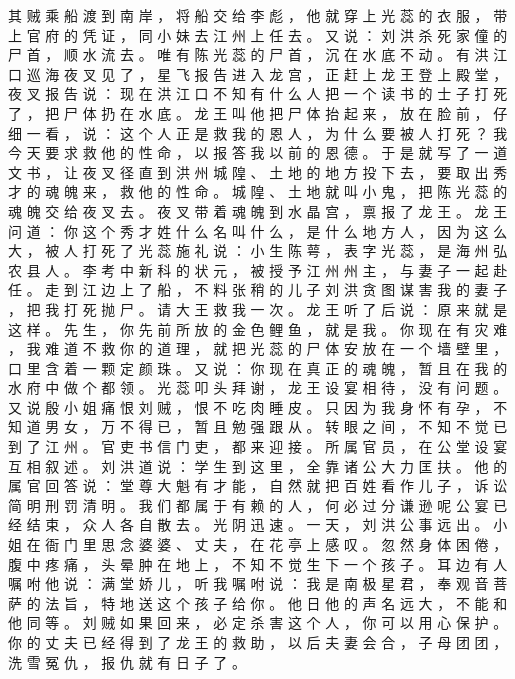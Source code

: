 {其 贼 乘 船 渡 到 南 岸 ， 将 船 交 给 李 彪 ， 他 就 穿 上 光 蕊 的 衣 服 ， 带 上 官 府 的 凭 证 ， 同 小 妹 去 江 州 上 任 去 。
又 说 ： 刘 洪 杀 死 家 僮 的 尸 首 ， 顺 水 流 去 。
唯 有 陈 光 蕊 的 尸 首 ， 沉 在 水 底 不 动 。
有 洪 江 口 巡 海 夜 叉 见 了 ， 星 飞 报 告 进 入 龙 宫 ， 正 赶 上 龙 王 登 上 殿 堂 ， 夜 叉 报 告 说 ： 现 在 洪 江 口 不 知 有 什 么 人 把 一 个 读 书 的 士 子 打 死 了 ， 把 尸 体 扔 在 水 底 。
龙 王 叫 他 把 尸 体 抬 起 来 ， 放 在 脸 前 ， 仔 细 一 看 ， 说 ： 这 个 人 正 是 救 我 的 恩 人 ， 为 什 么 要 被 人 打 死 ？
我 今 天 要 求 救 他 的 性 命 ， 以 报 答 我 以 前 的 恩 德 。
于 是 就 写 了 一 道 文 书 ， 让 夜 叉 径 直 到 洪 州 城 隍 、 土 地 的 地 方 投 下 去 ， 要 取 出 秀 才 的 魂 魄 来 ， 救 他 的 性 命 。
城 隍 、 土 地 就 叫 小 鬼 ， 把 陈 光 蕊 的 魂 魄 交 给 夜 叉 去 。
夜 叉 带 着 魂 魄 到 水 晶 宫 ， 禀 报 了 龙 王 。
龙 王 问 道 ： 你 这 个 秀 才 姓 什 么 名 叫 什 么 ， 是 什 么 地 方 人 ， 因 为 这 么 大 ， 被 人 打 死 了 光 蕊 施 礼 说 ： 小 生 陈 萼 ， 表 字 光 蕊 ， 是 海 州 弘 农 县 人 。
李 考 中 新 科 的 状 元 ， 被 授 予 江 州 州 主 ， 与 妻 子 一 起 赴 任 。
走 到 江 边 上 了 船 ， 不 料 张 稍 的 儿 子 刘 洪 贪 图 谋 害 我 的 妻 子 ， 把 我 打 死 抛 尸 。
请 大 王 救 我 一 次 。
龙 王 听 了 后 说 ： 原 来 就 是 这 样 。
先 生 ， 你 先 前 所 放 的 金 色 鲤 鱼 ， 就 是 我 。
你 现 在 有 灾 难 ， 我 难 道 不 救 你 的 道 理 ， 就 把 光 蕊 的 尸 体 安 放 在 一 个 墙 壁 里 ， 口 里 含 着 一 颗 定 颜 珠 。
又 说 ： 你 现 在 真 正 的 魂 魄 ， 暂 且 在 我 的 水 府 中 做 个 都 领 。
光 蕊 叩 头 拜 谢 ， 龙 王 设 宴 相 待 ， 没 有 问 题 。
又 说 殷 小 姐 痛 恨 刘 贼 ， 恨 不 吃 肉 睡 皮 。
只 因 为 我 身 怀 有 孕 ， 不 知 道 男 女 ， 万 不 得 已 ， 暂 且 勉 强 跟 从 。
转 眼 之 间 ， 不 知 不 觉 已 到 了 江 州 。
官 吏 书 信 门 吏 ， 都 来 迎 接 。
所 属 官 员 ， 在 公 堂 设 宴 互 相 叙 述 。
刘 洪 道 说 ： 学 生 到 这 里 ， 全 靠 诸 公 大 力 匡 扶 。
他 的 属 官 回 答 说 ： 堂 尊 大 魁 有 才 能 ， 自 然 就 把 百 姓 看 作 儿 子 ， 诉 讼 简 明 刑 罚 清 明 。
我 们 都 属 于 有 赖 的 人 ， 何 必 过 分 谦 逊 呢 公 宴 已 经 结 束 ， 众 人 各 自 散 去 。
光 阴 迅 速 。
一 天 ， 刘 洪 公 事 远 出 。
小 姐 在 衙 门 里 思 念 婆 婆 、 丈 夫 ， 在 花 亭 上 感 叹 。
忽 然 身 体 困 倦 ， 腹 中 疼 痛 ， 头 晕 肿 在 地 上 ， 不 知 不 觉 生 下 一 个 孩 子 。
耳 边 有 人 嘱 咐 他 说 ： 满 堂 娇 儿 ， 听 我 嘱 咐 说 ： 我 是 南 极 星 君 ， 奉 观 音 菩 萨 的 法 旨 ， 特 地 送 这 个 孩 子 给 你 。
他 日 他 的 声 名 远 大 ， 不 能 和 他 同 等 。
刘 贼 如 果 回 来 ， 必 定 杀 害 这 个 人 ， 你 可 以 用 心 保 护 。
你 的 丈 夫 已 经 得 到 了 龙 王 的 救 助 ， 以 后 夫 妻 会 合 ， 子 母 团 团 ， 洗 雪 冤 仇 ， 报 仇 就 有 日 子 了 。
}

